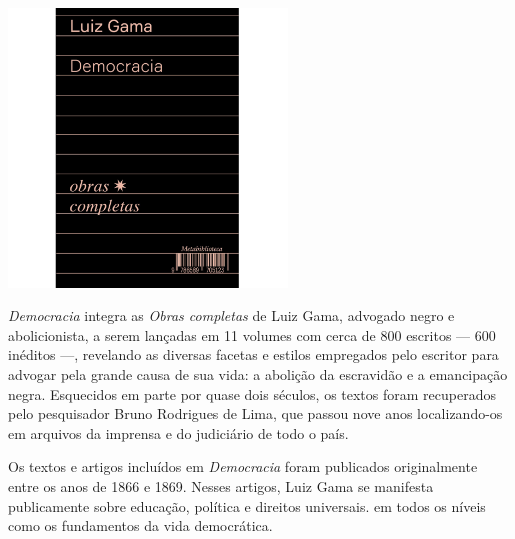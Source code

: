 \pagestyle{hedra}
\label{hedra}



\begin{center}
\hspace*{-3.6cm}
\hspace*{3.1cm}\includegraphics[width=74mm]{./CAPAS/democracia.jpg}
\end{center}

\hspace*{-7cm}\hrulefill\hspace*{-7cm}

\medskip

\noindent{}\textit{Democracia} integra as \textit{Obras completas} de Luiz Gama, advogado negro e abolicionista, a serem lançadas em 11 volumes com cerca de 800 escritos --- 600 inéditos ---, revelando as diversas facetas e estilos empregados pelo escritor para advogar pela grande causa de sua vida: a abolição da escravidão e a emancipação negra. Esquecidos em parte por quase dois séculos, os textos foram recuperados pelo pesquisador Bruno Rodrigues de Lima, que passou nove anos localizando-os em arquivos da imprensa e do judiciário de todo o país.

Os textos e artigos incluídos em \textit{Democracia} foram publicados originalmente entre os anos de 1866 e 1869. Nesses artigos, Luiz Gama se manifesta publicamente sobre educação, política e direitos universais.  em todos os níveis como os fundamentos da vida democrática.

